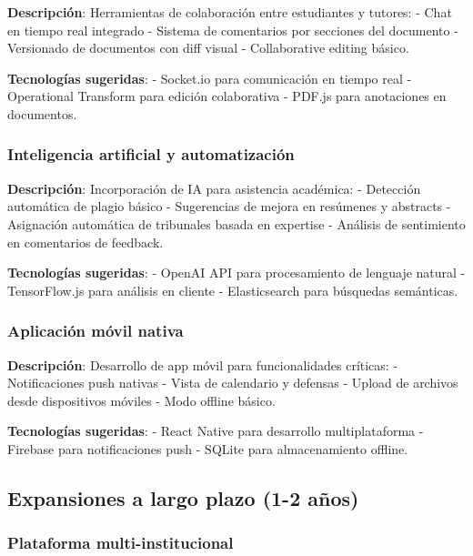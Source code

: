 \documentclass[12pt,a4paper,oneside]{report}
\begin{document}
\textbf{Descripción}: Herramientas de colaboración entre estudiantes y
tutores: - Chat en tiempo real integrado - Sistema de comentarios por
secciones del documento - Versionado de documentos con diff visual -
Collaborative editing básico.

\textbf{Tecnologías sugeridas}: - Socket.io para comunicación en tiempo
real - Operational Transform para edición colaborativa - PDF.js para
anotaciones en documentos.

\subsubsection{Inteligencia artificial y
automatización}\label{inteligencia-artificial-y-automatizaciuxf3n}

\textbf{Descripción}: Incorporación de IA para asistencia académica: -
Detección automática de plagio básico - Sugerencias de mejora en
resúmenes y abstracts - Asignación automática de tribunales basada en
expertise - Análisis de sentimiento en comentarios de feedback.

\textbf{Tecnologías sugeridas}: - OpenAI API para procesamiento de
lenguaje natural - TensorFlow.js para análisis en cliente -
Elasticsearch para búsquedas semánticas.

\subsubsection{Aplicación móvil
nativa}\label{aplicaciuxf3n-muxf3vil-nativa}

\textbf{Descripción}: Desarrollo de app móvil para funcionalidades
críticas: - Notificaciones push nativas - Vista de calendario y defensas
- Upload de archivos desde dispositivos móviles - Modo offline básico.

\textbf{Tecnologías sugeridas}: - React Native para desarrollo
multiplataforma - Firebase para notificaciones push - SQLite para
almacenamiento offline.

\subsection{Expansiones a largo plazo (1-2
años)}\label{expansiones-a-largo-plazo-1-2-auxf1os}

\subsubsection{Plataforma
multi-institucional}\label{plataforma-multi-institucional}
\end{document}
